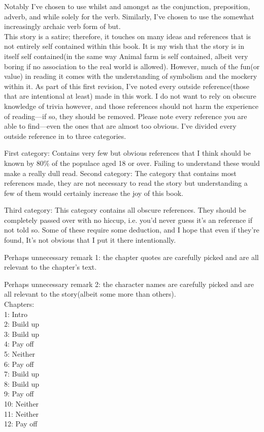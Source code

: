 \documentclass[smalldemyvopaper,11pt,twoside,onecolumn,openright,extrafontsizes]{memoir}
\begin{document}
Notably I've chosen to use whilst and amongst as the conjunction, preposition, adverb, and while solely for the verb. Similarly, I've chosen to use the somewhat increasingly archaic verb form of but. \\

This story is a satire; therefore, it touches on many ideas and references that is not entirely self contained within this book. It is my wish that the story is in itself self contained(in the same way Animal farm is self contained, albeit very boring if no association to the real world is allowed). However, much of the fun(or value) in reading it comes with the understanding of symbolism and the mockery within it. 
As part of this first revision, I've noted every outside reference(those that are intentional at least) made in this work. I do not want to rely on obscure knowledge of trivia however, and those references should not harm the experience of reading---if so, they should be removed. Please note every reference you are able to find---even the ones that are almost too obvious.
I've divided every outside reference in to three categories.

First category: Contains very few but obvious references that I think should be known by 80\% of the populace aged 18 or over. Failing to understand these would make a really dull read.
Second category: The category that contains
 most references made, they are not necessary to read the story but understanding a few of them would certainly increase the joy of this book.
 
Third category: This category contains all obscure references. They should be completely passed over with no hiccup, i.e. you'd never guess it's an reference if not told so. Some of these require some deduction, and I hope that even if they're found, It's not obvious that I put it there intentionally.

Perhaps unnecessary remark 1: the chapter quotes are carefully picked and are all relevant to the chapter's text.

Perhaps unnecessary remark 2: the character names are carefully picked and are all relevant to the story(albeit some more than others).\\[1cm]
Chapters:\\
1: Intro\\
2: Build up\\
3: Build up\\
4: Pay off\\
5: Neither\\
6: Pay off\\
7: Build up\\
8: Build up\\
9: Pay off\\
10: Neither\\
11: Neither\\
12: Pay off\\
\end{document}
